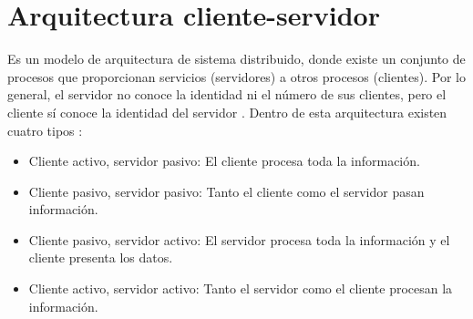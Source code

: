\section{Arquitectura cliente-servidor} \label{sect:Patrones de arquitectura}

Es un modelo de arquitectura de sistema distribuido, donde existe un conjunto de procesos que proporcionan servicios (servidores) a otros procesos (clientes). Por lo general, el servidor no conoce la identidad ni el número de sus clientes, pero el cliente sí conoce la identidad del servidor \cite{ACS0}. Dentro de esta arquitectura existen cuatro tipos \cite{ACS1}:

\begin{itemize}
\item Cliente activo, servidor pasivo: El cliente procesa toda la información.
\item Cliente pasivo, servidor pasivo: Tanto el cliente como el servidor pasan información.
\item Cliente pasivo, servidor activo: El servidor procesa toda la información y el cliente presenta los datos.
\item Cliente activo, servidor activo: Tanto el servidor como el cliente procesan la información.
\end{itemize}